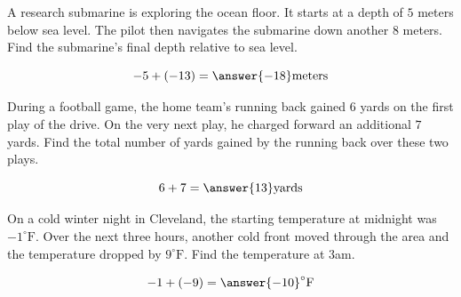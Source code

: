 \documentclass{ximera}[font=12pt]
\begin{document}
\begin{problem}
A research submarine is exploring the ocean floor.  It starts at a depth of $5$ meters below sea level.  The pilot then 
navigates the submarine down another $8$ meters.  Find the submarine's final depth relative to sea level.

\[ -5 + (-13) = \answer{-18} \textrm{meters} \]

\end{problem}


\begin{problem}
During a football game, the home team's running back gained $6$ yards on the first play of the drive. 
On the very next play, he charged forward an additional $7$ yards.  Find the total number of yards 
gained by the running back over these two plays.

\[ 6 + 7 = \answer{13} \textrm{yards} \]

\end{problem}


\begin{problem}
On a cold winter night in Cleveland, the starting temperature at midnight was $-1^\circ\text{F}$.  Over the next three 
hours, another cold front moved through the area and the temperature dropped by $9^\circ\text{F}.$  Find the 
temperature at 3am.

\[ -1 + (-9) = \answer{-10} ^\circ\text{F} \]
\end{problem}
\end{document}
